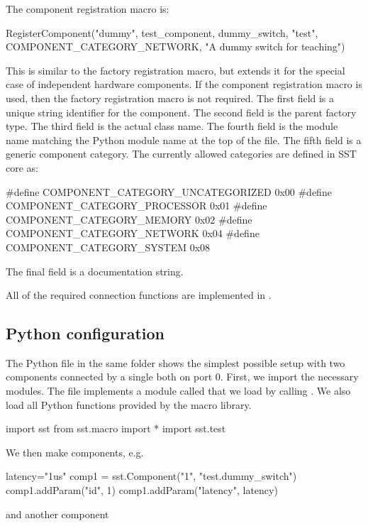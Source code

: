 The component registration macro is:

\begin{CppCode}
RegisterComponent("dummy", test_component, dummy_switch,
       "test", COMPONENT_CATEGORY_NETWORK,
       "A dummy switch for teaching")
\end{CppCode}
This is similar to the factory registration macro, but extends it for the special case of independent hardware components.
If the component registration macro is used, then the factory registration macro is not required.
The first field is a unique string identifier for the component.
The second field is the parent factory type.
The third field is the actual class name.
The fourth field is the module name matching the Python module name at the top of the  file.
The fifth field is a generic component category.
The currently allowed categories are defined in SST core as:

\begin{CppCode}
#define COMPONENT_CATEGORY_UNCATEGORIZED  0x00
#define COMPONENT_CATEGORY_PROCESSOR      0x01
#define COMPONENT_CATEGORY_MEMORY         0x02
#define COMPONENT_CATEGORY_NETWORK        0x04
#define COMPONENT_CATEGORY_SYSTEM         0x08
\end{CppCode}
The final field is a documentation string.

All of the required connection functions are implemented in .

\subsection{Python configuration}
The Python file  in the same folder shows the simplest possible setup with two components connected by a single both on port 0.
First, we import the necessary modules. The file  implements a module called  that we load by calling .
We also load all Python functions provided by the macro library.

\begin{CppCode}
import sst
from sst.macro import *
import sst.test
\end{CppCode}
We then make components, e.g.

\begin{CppCode}
latency="1us"
comp1 = sst.Component("1", "test.dummy_switch")
comp1.addParam("id", 1)
comp1.addParam("latency", latency)
\end{CppCode}
and another component

